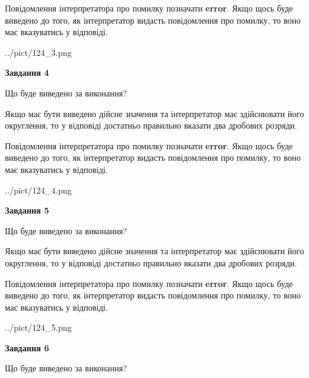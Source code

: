\documentclass[12pt, ukrainian]{article}
\begin{document}
{\begin {Large}
Повідомлення інтерпретатора про помилку позначати \textbf{error}.
Якщо щось буде виведено до того, як інтерпретатор видасть повідомлення про помилку, 
то воно має вказуватись у відповіді. \par

\begin{center}
	{../pict/124_3.png}
\end{center}
\newpage

{\begin {center}\textbf{Завдання 4}\end {center}}\par
Що буде виведено за виконання? \par

Якщо має бути виведено дійсне значення та інтерпретатор має здійснювати його округлення, 
то у відповіді достатньо правильно вказати два дробових розряди.

Повідомлення інтерпретатора про помилку позначати \textbf{error}.
Якщо щось буде виведено до того, як інтерпретатор видасть повідомлення про помилку, 
то воно має вказуватись у відповіді. \par

\begin{center}
	{../pict/124_4.png}
\end{center}
\newpage

{\begin {center}\textbf{Завдання 5}\end {center}}\par
Що буде виведено за виконання? \par

Якщо має бути виведено дійсне значення та інтерпретатор має здійснювати його округлення, 
то у відповіді достатньо правильно вказати два дробових розряди.

Повідомлення інтерпретатора про помилку позначати \textbf{error}.
Якщо щось буде виведено до того, як інтерпретатор видасть повідомлення про помилку, 
то воно має вказуватись у відповіді. \par

\begin{center}
	{../pict/124_5.png}
\end{center}
\newpage

{\begin {center}\textbf{Завдання 6}\end {center}}\par
Що буде виведено за виконання? \par


\end{Large}}
\end{document}
